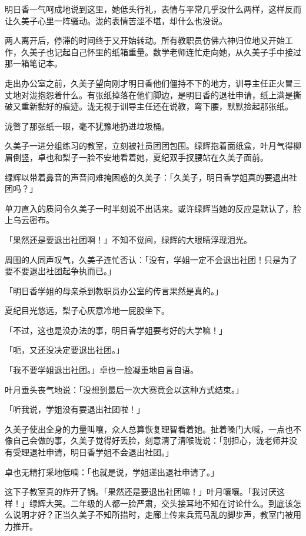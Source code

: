 \documentclass[UTF8]{ctexart}
\begin{document}
    明日香一气呵成地说到这里，她低头行礼，表情与平常几乎没什么两样，这样反而让久美子心里一阵骚动。泷的表情苦涩不堪，却什么也没说。 

    两人离开后，停滞的时间终于又开始转动。所有教职员仿佛六神归位地又开始工作，久美子也记起自己怀里的纸箱重量。数学老师连忙走向她，从久美子手中接过那一箱笔记本。 

    走出办公室之前，久美子望向刚才明日香他们僵持不下的地方，训导主任正火冒三丈地对泷抱怨着什么。有张纸掉落在他们脚边，是明日香的退社申请，纸上满是撕破又重新黏好的痕迹。泷无视于训导主任还在说教，弯下腰，默默捡起那张纸。 

    泷瞥了那张纸一眼，毫不犹豫地扔进垃圾桶。 

    久美子一进分组练习的教室，立刻被社员团团包围。绿辉抱着面纸盒，叶月气得柳眉倒竖，卓也和梨子一脸不安地看着她，夏纪双手扠腰站在久美子面前。 

    绿辉以带着鼻音的声音问难掩困惑的久美子：「久美子，明日香学姐真的要退出社团吗？」 

    单刀直入的质问令久美子一时半刻说不出话来。或许绿辉当她的反应是默认了，脸上乌云密布。 

    「果然还是要退出社团啊！」不知不觉间，绿辉的大眼睛浮现泪光。 

    周围的人同声叹气，久美子连忙否认：「没有，学姐一定不会退出社团！只是为了要不要退出社团起争执而已。」 

    「明日香学姐的母亲杀到教职员办公室的传言果然是真的。」 

    夏纪目光悠远，梨子心灰意冷地一屁股坐下。 

    「不过，这也是没办法的事，明日香学姐要考好的大学嘛！」 

    「呃，又还没决定要退出社团。」 

    「我不要学姐退出社团。」卓也一脸凝重地自言自语。 

    叶月垂头丧气地说：「没想到最后一次大赛竟会以这种方式结束。」 

    「听我说，学姐没有要退出社团啦！」 

    久美子使出全身的力量叫嚷，众人总算恢复理智看着她。扯着嗓门大喊，一点也不像自己会做的事，久美子觉得好丢脸，刻意清了清喉咙说：「别担心，泷老师并没有受理退社申请，明日香学姐不会退出社团。」 

    卓也无精打采地低喃：「也就是说，学姐递出退社申请了。」 

    这下子教室真的炸开了锅。「果然还是要退出社团嘛！」叶月嚷嚷。「我讨厌这样！」绿辉大哭。二年级的人都一脸严肃，交头接耳地不知在讨论什么。到底该怎么说明才好？正当久美子不知所措时，走廊上传来兵荒马乱的脚步声，教室门被用力推开。 
\end{document}
